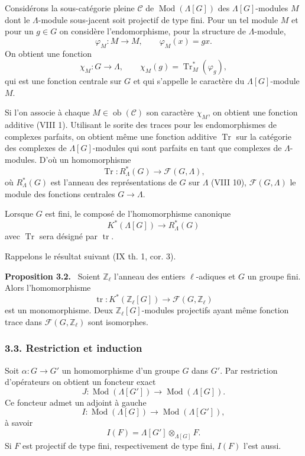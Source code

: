\documentclass[11pt]{article}
\newenvironment{statement}[1]{\par\medskip\noindent\textbf{#1.}\ }{\par\medskip}
\providecommand{\Tr}{\operatorname{Tr}}
\providecommand{\Tr}{\operatorname{Tr}}
\providecommand{\Ob}{\operatorname{ob}}
\providecommand{\Tr}{\operatorname{Tr}}
\providecommand{\Ob}{\operatorname{ob}}
\providecommand{\Tr}{\operatorname{Tr}}
\providecommand{\Ob}{\operatorname{Ob}}
\providecommand{\Mod}{\operatorname{Mod}}
\providecommand{\tr}{\operatorname{tr}}
\begin{document}
Considérons la sous-catégorie pleine $\mathcal C$ de $\Mod(\Lambda[G])$ des $\Lambda[G]$-modules $M$ dont le $\Lambda$-module sous-jacent soit projectif de type fini. Pour un tel module $M$ et pour un $g\in G$ on considère l'endomorphisme, pour la structure de $\Lambda$-module,
\[
\varphi_M:M\longrightarrow M,
\qquad \varphi_M(x)=gx.
\]
On obtient une fonction
\[
\chi_M:G\longrightarrow \Lambda,
\qquad \chi_M(g)=\Tr^*_M(\varphi_g),
\]
qui est une fonction centrale sur $G$ et qui s'appelle le caractère du $\Lambda[G]$-module $M$.

Si l'on associe à chaque $M\in\Ob(\mathcal C)$ son caractère $\chi_M$, on obtient une fonction additive (VIII 1). Utilisant le sorite des traces pour les endomorphismes de complexes parfaits, on obtient même une fonction additive $\Tr$ sur la catégorie des complexes de $\Lambda[G]$-modules qui sont parfaits en tant que complexes de $\Lambda$-modules. D'où un homomorphisme
\[
\Tr:R^*_{\Lambda}(G)\longrightarrow \mathcal F(G,\Lambda),
\]
où $R^*_{\Lambda}(G)$ est l'anneau des représentations de $G$ sur $\Lambda$ (VIII 10), $\mathcal F(G,\Lambda)$ le module des fonctions centrales $G\to\Lambda$.

Lorsque $G$ est fini, le composé de l'homomorphisme canonique
\[
K^*(\Lambda[G])\longrightarrow R^*_{\Lambda}(G)
\]
avec $\Tr$ sera désigné par $\tr$.

Rappelons le résultat suivant (IX th. 1, cor. 3).

\begin{statement}{Proposition 3.2}
Soient $\mathbb Z_\ell$ l'anneau des entiers $\ell$-adiques et $G$ un groupe fini. Alors l'homomorphisme
\[
\tr:K^*(\mathbb Z_\ell[G])\longrightarrow \mathcal F(G,\mathbb Z_\ell)
\]
est un monomorphisme. Deux $\mathbb Z_\ell[G]$-modules projectifs ayant même fonction trace dans $\mathcal F(G,\mathbb Z_\ell)$ sont isomorphes.
\end{statement}

\subsubsection*{3.3. Restriction et induction}

Soit $\alpha:G\to G'$ un homomorphisme d'un groupe $G$ dans $G'$. Par restriction d'opérateurs on obtient un foncteur exact
\[
J:\Mod(\Lambda[G'])\longrightarrow\Mod(\Lambda[G]).
\]
Ce foncteur admet un adjoint à gauche
\[
I:\Mod(\Lambda[G])\longrightarrow\Mod(\Lambda[G']),
\]
à savoir
\[
I(F)=\Lambda[G']\otimes_{\Lambda[G]}F.
\]
Si $F$ est projectif de type fini, respectivement de type fini, $I(F)$ l'est aussi.
\end{document}
